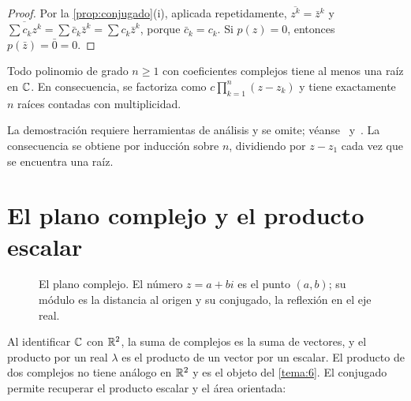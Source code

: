\begin{proof}
Por la \cref{prop:conjugado}(i), aplicada repetidamente, $\overline{z^{k}}=\bar z^{k}$ y $\overline{\sum c_kz^{k}}=\sum\bar c_k\bar z^{k}=\sum c_k\bar z^{k}$, porque $\bar c_k=c_k$. Si $p(z)=0$, entonces $p(\bar z)=\bar0=0$.
\end{proof}

\begin{teorema}\label{teo:fundamental}
Todo polinomio de grado $n\ge1$ con coeficientes complejos tiene al menos una raíz en $\mathbb{C}$. En consecuencia, se factoriza como $c\prod_{k=1}^{n}(z-z_k)$ y tiene exactamente $n$ raíces contadas con multiplicidad.
\end{teorema}

La demostración requiere herramientas de análisis y se omite; véanse~\cite[§5.3]{mit1803} y~\cite{needham}. La consecuencia se obtiene por inducción sobre $n$, dividiendo por $z-z_1$ cada vez que se encuentra una raíz.

\section{El plano complejo y el producto escalar}

\begin{figure}[ht]
\centering
{}
\caption{El plano complejo. El número $z=a+bi$ es el punto $(a,b)$; su módulo es la distancia al origen y su conjugado, la reflexión en el eje real.}
\label{fig:argand}
\end{figure}

Al identificar $\mathbb{C}$ con $\mathbb{R}^{2}$, la suma de complejos es la suma de vectores, y el producto por un real $\lambda$ es el producto de un vector por un escalar. El producto de dos complejos no tiene análogo en $\mathbb{R}^{2}$ y es el objeto del \cref{tema:6}. El conjugado permite recuperar el producto escalar y el área orientada:

